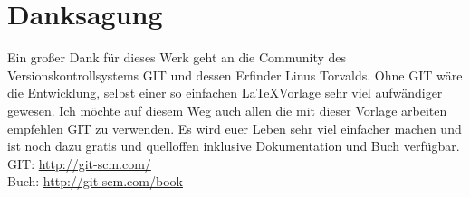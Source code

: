 \chapter*{Danksagung}

Ein großer Dank für dieses Werk geht an die Community des Versionskontrollsystems GIT und dessen Erfinder Linus Torvalds. Ohne GIT wäre die Entwicklung, selbst einer so einfachen \LaTeX Vorlage sehr viel aufwändiger gewesen. Ich möchte auf diesem Weg auch allen die mit dieser Vorlage arbeiten empfehlen GIT zu verwenden. Es wird euer Leben sehr viel einfacher machen und ist noch dazu gratis und quelloffen inklusive Dokumentation und Buch verfügbar.
\center
GIT: \url{http://git-scm.com/} \\
Buch: \url{http://git-scm.com/book}
\newpage